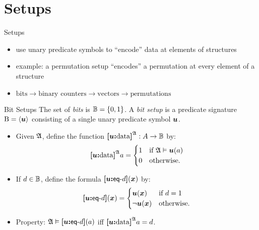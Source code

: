 \documentclass{beamer}
\begin{document}
\section{Setups}
\begin{frame}{Setups}
\begin{itemize}
  \item
   use unary predicate symbols to ``encode'' data at elements of structures
  
  \item
  example: a permutation setup ``encodes'' a permutation at every
  element of a structure
  
  \item
  $\text{bits} \to \text{binary counters} \to \text{vectors} \to
  \text{permutations}$
\end{itemize}
\end{frame}

\begin{frame}{Bit Setups}
The set of \emph{bits} is $\mathbb{B} = \left\{0,1\right\}$.
A \emph{bit setup} is a predicate signature ${\mathrm{B}} = \left\langle \bm{u} \right\rangle$ consisting of a
single unary predicate symbol $\bm{u}$.
\begin{itemize}
  \item Given $\mathfrak{A}$, define the function ${\bm{[}\bm{u}\mathord{\bm{:}}\mathrm{data}\bm{]}}^{\mathfrak{A}} :
  A\to\mathbb{B}$ by:
  \[
    {\bm{[}\bm{u}\mathord{\bm{:}}\mathrm{data}\bm{]}}^{\mathfrak{A}} a = \begin{cases}
      1 &\text{if } \mathfrak{A} \vDash \bm{u}(a) \\
      0 &\text{otherwise.}
    \end{cases}
  \]
  
  \item
  If $d\in\mathbb{B}$, define the formula ${\bm{[}\bm{u}\mathord{\bm{:}}\mathsf{eq}{\hbox{-}}d\bm{]}}(\bm{x})$ by:
  \[
  {\bm{[}\bm{u}\mathord{\bm{:}}\mathsf{eq}{\hbox{-}}d\bm{]}}(\bm{x}) = \begin{cases}
    \bm{u}(\bm{x}) &\text{if } d = 1 \\
    \lnot\bm{u}(\bm{x}) &\text{otherwise.}
  \end{cases}
  \]
  
  \item Property: $\mathfrak{A}\vDash{\bm{[}\bm{u}\mathord{\bm{:}}\mathsf{eq}{\hbox{-}}d\bm{]}}(a)$ iff ${\bm{[}\bm{u}\mathord{\bm{:}}\mathrm{data}\bm{]}}^{\mathfrak{A}}a =
  d$.
\end{itemize}
\end{frame}
\end{document}
